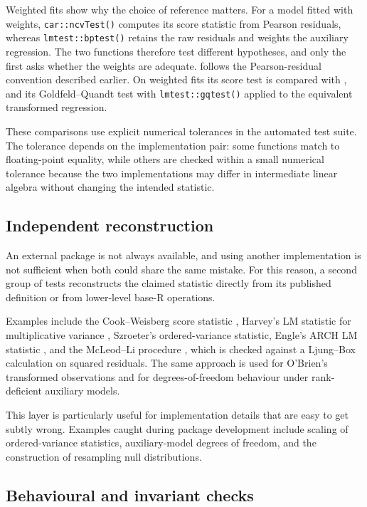 Weighted fits show why the choice of reference matters. For a model fitted
with weights, \texttt{car::ncvTest()} computes its score statistic from Pearson
residuals, whereas \texttt{lmtest::bptest()} retains the raw residuals and weights
the auxiliary regression. The two functions therefore test different
hypotheses, and only the first asks whether the weights are adequate.
 follows the Pearson-residual convention described
earlier. On weighted fits its score test is compared with , and
its Goldfeld--Quandt test with \texttt{lmtest::gqtest()} applied to the equivalent
transformed regression.

These comparisons use explicit numerical tolerances in the automated test
suite. The tolerance depends on the implementation pair: some functions match
to floating-point equality, while others are checked within a small numerical
tolerance because the two implementations may differ in intermediate linear
algebra without changing the intended statistic.

\subsection{Independent reconstruction}\label{independent-reconstruction}

An external package is not always available, and using another implementation
is not sufficient when both could share the same mistake. For this reason, a
second group of tests reconstructs the claimed statistic directly from its
published definition or from lower-level base-R operations.

Examples include the Cook--Weisberg score statistic \citep{cook1983detection},
Harvey's LM statistic for multiplicative variance \citep{harvey1976estimating},
Szroeter's ordered-variance statistic, Engle's ARCH LM statistic
\citep{engle1982autoregressive}, and the McLeod--Li procedure \citep{mcleod1983diagnosis}, which is checked
against a Ljung--Box calculation on squared residuals. The same approach is
used for O'Brien's transformed observations and for degrees-of-freedom
behaviour under rank-deficient auxiliary models.

This layer is particularly useful for implementation details that are easy to
get subtly wrong. Examples caught during package development include scaling of
ordered-variance statistics, auxiliary-model degrees of freedom, and the
construction of resampling null distributions.

\subsection{Behavioural and invariant checks}\label{behavioural-and-invariant-checks}

